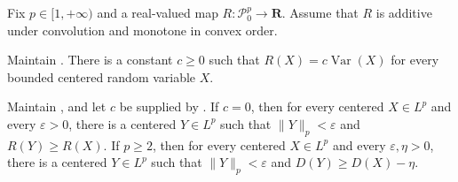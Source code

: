 \documentclass[10pt,a4paper]{amsart}
\begin{document}
\begin{assumption}\label{ass:additive-convex-order}
Fix \(p\in[1,+\infty)\) and a real-valued map \(R\colon\mathcal P_0^p\to\mathbf R\). Assume that \(R\) is additive under convolution and monotone in convex order.
\end{assumption}

\begin{lemma}\label{lem:bounded-calibration}
Maintain . There is a constant \(c\geq0\) such that \(R(X)=c\operatorname{Var}(X)\) for every bounded centered random variable \(X\).
\end{lemma}

\begin{lemma}\label{lem:tail-compression}
Maintain , and let \(c\) be supplied by . If \(c=0\), then for every centered \(X\in L^p\) and every \(\varepsilon>0\), there is a centered \(Y\in L^p\) such that \(\lVert Y\rVert_p<\varepsilon\) and \(R(Y)\geq R(X)\). If \(p\geq2\), then for every centered \(X\in L^p\) and every \(\varepsilon,\eta>0\), there is a centered \(Y\in L^p\) such that \(\lVert Y\rVert_p<\varepsilon\) and \(D(Y)\geq D(X)-\eta\).
\end{lemma}
\end{document}
